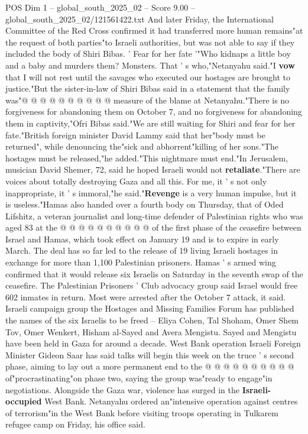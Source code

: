 \begin{textsample}{POS Dim 1 – global\_south\_2025\_02 – Score 9.00 – global\_south\_2025\_02/121561422.txt}
And later Friday, the International Committee of the Red Cross confirmed it had transferred more human remains"at the request of both parties"to Israeli authorities, but was not able to say if they included the body of Shiri Bibas. ' Fear for her fate '"Who kidnaps a little boy and a baby and murders them?
Monsters.
That ' s who,"Netanyahu said."I \textbf{vow} that I will not rest until the savages who executed our hostages are brought to justice."But the sister-in-law of Shiri Bibas said in a statement that the family was"@ @ @ @ @ @ @ @ @ @ measure of the blame at Netanyahu."There is no forgiveness for abandoning them on October 7, and no forgiveness for abandoning them in captivity,"Ofri Bibas said."We are still waiting for Shiri and fear for her fate."British foreign minister David Lammy said that her"body must be returned", while denouncing the"sick and abhorrent"killing of her sons."The hostages must be released,"he added."This nightmare must end."In Jerusalem, musician David Shemer, 72, said he hoped Israeli would not \textbf{retaliate}."There are voices about totally destroying Gaza and all this.
For me, it ' s not only inappropriate, it ' s immoral,"he said."\textbf{Revenge} is a very human impulse, but it is useless."Hamas also handed over a fourth body on Thursday, that of Oded Lifshitz, a veteran journalist and long-time defender of Palestinian rights who was aged 83 at the @ @ @ @ @ @ @ @ @ @ of the first phase of the ceasefire between Israel and Hamas, which took effect on January 19 and is to expire in early March.
The deal has so far led to the release of 19 living Israeli hostages in exchange for more than 1,100 Palestinian prisoners.
Hamas ' s armed wing confirmed that it would release six Israelis on Saturday in the seventh swap of the ceasefire.
The Palestinian Prisoners ' Club advocacy group said Israel would free 602 inmates in return.
Most were arrested after the October 7 attack, it said.
Israeli campaign group the Hostages and Missing Families Forum has published the names of the six Israelis to be freed -- Eliya Cohen, Tal Shoham, Omer Shem Tov, Omer Wenkert, Hisham al-Sayed and Avera Mengistu.
Sayed and Mengistu have been held in Gaza for around a decade.
West Bank operation Israeli Foreign Minister Gideon Saar has said talks will begin this week on the truce ' s second phase, aiming to lay out a more permanent end to the @ @ @ @ @ @ @ @ @ @ of"procrastinating"on phase two, saying the group was"ready to engage"in negotiations.
Alongside the Gaza war, violence has surged in the \textbf{Israeli-occupied} West Bank.
Netanyahu ordered an"intensive operation against centres of terrorism"in the West Bank before visiting troops operating in Tulkarem refugee camp on Friday, his office said.

\end{textsample}
